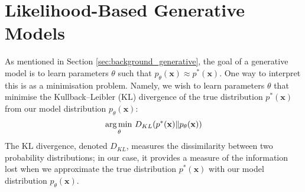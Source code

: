 \documentclass[ oneside,%
                    author={George Herbert},
                    degree={MSci},
                     title={Video Diffusion Models for Climate Simulations},
                  subtitle={}]{dissertation}
\begin{document}
\section{Likelihood-Based Generative Models}
\label{sec:background_unbiased_objective}

As mentioned in Section \ref{sec:background_generative}, the goal of a generative model is to learn parameters $\theta$ such that $p_\theta(\mathbf{x})\approx p^*(\mathbf{x})$. One way to interpret this is as a minimisation problem. Namely, we wish to learn parameters $\theta$ that minimise the Kullback--Leibler (KL) divergence of the true distribution $p^*(\mathbf{x})$ from our model distribution $p_\theta(\mathbf{x})$:
\begin{align}
      \operatorname*{arg\,min\,}_\theta D_{KL}(p^*(\mathbf{x})\Vert p_\theta(\mathbf{x}))
\end{align}
The KL divergence, denoted $D_{KL}$, measures the dissimilarity between two probability distributions; in our case, it provides a measure of the information lost when we approximate the true distribution $p^*(\mathbf{x})$ with our model distribution $p_\theta(\mathbf{x})$.
\end{document}

